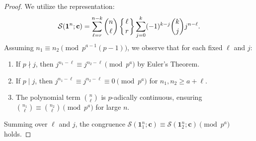\documentclass[12pt]{amsart}
\newtheorem{theorem}{Theorem}[section]
\theoremstyle{definition}
\newcommand{\vn}{\mathbf{1}^n}
\begin{document}
\begin{proof}
We utilize the representation:
\begin{equation*}
    \mathcal{S}(\vn; \mathbf{c}) = \sum_{\ell=r}^{n-k} \binom{n}{\ell} \left\{ \genfrac{}{}{0pt}{}{\ell}{r} \right\} \sum_{j=0}^{k} (-1)^{k-j} \binom{k}{j} j^{n-\ell}.
\end{equation*}
Assuming $n_1 \equiv n_2 \pmod{p^{a-1}(p-1)}$, we observe that for each fixed $\ell$ and $j$:
\begin{enumerate}
    \item If $p \nmid j$, then $j^{n_1-\ell} \equiv j^{n_2-\ell} \pmod{p^a}$ by Euler's Theorem.
    \item If $p \mid j$, then $j^{n_1-\ell} \equiv j^{n_2-\ell} \equiv 0 \pmod{p^a}$ for $n_1, n_2 \geq a + \ell$.
    \item The polynomial term $\binom{n}{\ell}$ is $p$-adically continuous, ensuring $\binom{n_1}{\ell} \equiv \binom{n_2}{\ell} \pmod{p^a}$ for large $n$.
\end{enumerate}
Summing over $\ell$ and $j$, the congruence $\mathcal{S}(\vn_1; \mathbf{c}) \equiv \mathcal{S}(\vn_2; \mathbf{c}) \pmod{p^a}$ holds.
\end{proof}
%
\end{document}
